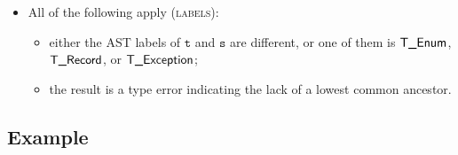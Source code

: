 \documentclass{book}
\newcommand\vt[0]{\texttt{t}}
\newcommand\vs[0]{\texttt{s}}
\begin{document}
\begin{itemize}
\begin{itemize}
    \item All of the following apply (\textsc{labels}):
    \begin{itemize}
      \item either the AST labels of $\vt$ and $\vs$ are different, or one of them is $\textsf{T\_Enum}$, $\textsf{T\_Record}$, or $\textsf{T\_Exception}$;
      \item the result is a type error indicating the lack of a lowest common ancestor.
    \end{itemize}
  \end{itemize}
\end{itemize}

\subsection{Example}

\end{document}
